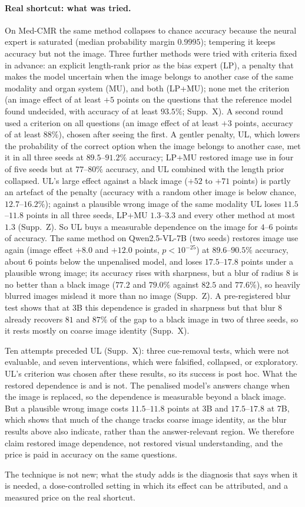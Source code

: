 \paragraph{Real shortcut: what was tried.}
On Med-CMR the same method collapses to chance accuracy because the neural expert is saturated (median probability margin $0.9995$); tempering it keeps accuracy but not the image.
Three further methods were tried with criteria fixed in advance: an explicit length-rank prior as the bias expert (LP), a penalty that makes the model uncertain when the image belongs to another case of the same modality and organ system (MU), and both (LP+MU); none met the criterion (an image effect of at least $+5$ points on the questions that the reference model found undecided, with accuracy of at least $93.5\%$; Supp.~X).
A second round used a criterion on all questions (an image effect of at least $+3$ points, accuracy of at least $88\%$), chosen after seeing the first.
A gentler penalty, UL, which lowers the probability of the correct option when the image belongs to another case, met it in all three seeds at $89.5$--$91.2\%$ accuracy; LP+MU restored image use in four of five seeds but at $77$--$80\%$ accuracy, and UL combined with the length prior collapsed.
UL's large effect against a black image ($+52$ to $+71$ points) is partly an artefact of the penalty (accuracy with a random other image is below chance, $12.7$--$16.2\%$); against a plausible wrong image of the same modality UL loses $11.5$--$11.8$ points in all three seeds, LP+MU $1.3$--$3.3$ and every other method at most $1.3$ (Supp.~Z).
So UL buys a measurable dependence on the image for $4$--$6$ points of accuracy.
The same method on Qwen2.5-VL-7B (two seeds) restores image use again (image effect $+8.0$ and $+12.0$ points, $p<10^{-25}$) at $89.6$--$90.5\%$ accuracy, about 6 points below the unpenalised model, and loses $17.5$--$17.8$ points under a plausible wrong image; its accuracy rises with sharpness, but a blur of radius 8 is no better than a black image ($77.2$ and $79.0\%$ against $82.5$ and $77.6\%$), so heavily blurred images mislead it more than no image (Supp.~Z).
A pre-registered blur test shows that at 3B this dependence is graded in sharpness but that blur 8 already recovers $81$ and $87\%$ of the gap to a black image in two of three seeds, so it rests mostly on coarse image identity (Supp.~X).

Ten attempts preceded UL (Supp.~X): three cue-removal tests, which were not evaluable, and seven interventions, which were falsified, collapsed, or exploratory. UL's criterion was chosen after these results, so its success is post hoc.
What the restored dependence is and is not. The penalised model's answers change when the image is replaced, so the dependence is measurable beyond a black image. But a plausible wrong image costs $11.5$--$11.8$ points at 3B and $17.5$--$17.8$ at 7B, which shows that much of the change tracks coarse image identity, as the blur results above also indicate, rather than the answer-relevant region. We therefore claim restored image dependence, not restored visual understanding, and the price is paid in accuracy on the same questions.

The technique is not new; what the study adds is the diagnosis that says when it is needed, a dose-controlled setting in which its effect can be attributed, and a measured price on the real shortcut.
